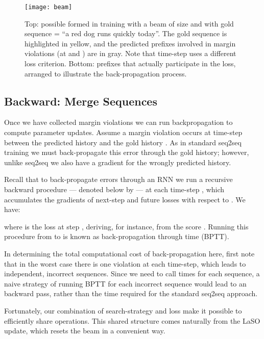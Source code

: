 \documentclass[11pt,letterpaper]{article}
\begin{document}
\begin{figure}[t!]
\centering
\texttt{[image: beam]}
\caption{Top: possible  formed in training with a beam of size  and with gold sequence  = ``a red dog runs quickly today''. The gold sequence is highlighted in yellow, and the predicted prefixes involved in margin violations (at  and ) are in gray. Note that time-step  uses a different loss criterion. Bottom: prefixes that actually participate in the loss, arranged to illustrate the back-propagation process.}
\label{fig:backprop}
\end{figure}


\subsection{Backward: Merge Sequences}
Once we have collected margin violations we can run backpropagation to compute parameter updates. Assume a
margin violation occurs at time-step  between the predicted history
 and the gold history . As in standard
seq2seq training we must back-propagate this error through the gold
history; however, unlike seq2seq we also have a gradient for the
wrongly predicted history.

Recall that to back-propagate errors through an RNN we run a recursive backward procedure --- denoted below by  --- at each time-step , which accumulates the 
gradients of next-step and future losses with respect to . We have: 
 
where  is the loss at step , deriving, for instance, from the score .
Running this  procedure from  to  is known as back-propagation through time (BPTT).

In determining the total computational cost of back-propagation here, first note that in the worst case there is one violation at each time-step, which
leads to  independent, incorrect sequences. Since we need to call 
 times for each sequence, a naive strategy of running BPTT for each incorrect sequence would lead to an  backward pass, rather than the  time required for the standard seq2seq approach. 

Fortunately, our combination of search-strategy and loss make it
possible to efficiently share  operations. This shared
structure comes naturally from the LaSO update, which resets the beam in a convenient way. 
\end{document}

